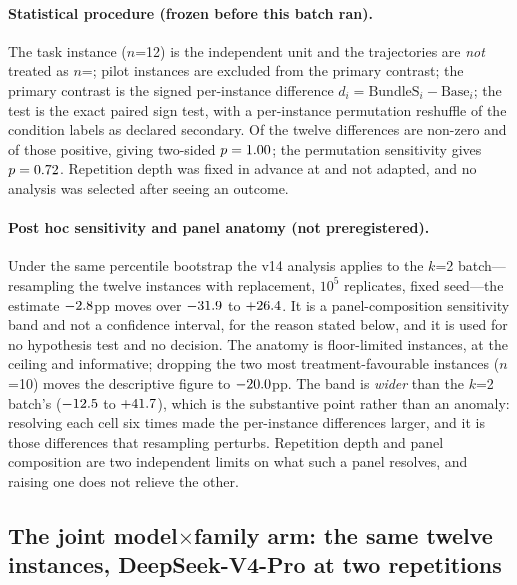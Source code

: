 \documentclass{article}
\begin{document}
\paragraph{Statistical procedure (frozen before this batch ran).} The task instance ($n$=12) is the independent unit and the \StatEightAEpisodes{} trajectories are \emph{not} treated as $n$=\StatEightAEpisodes{}; pilot instances are excluded from the primary contrast; the primary contrast is the signed per-instance difference $d_i=\mathrm{BundleS}_i-\mathrm{Base}_i$; the test is the exact paired sign test, with a per-instance permutation reshuffle of the condition labels as declared secondary. Of the twelve differences \StatEightASignNonzero{} are non-zero and \StatEightASignPositive{} of those positive, giving two-sided $p=1.00$; the permutation sensitivity gives $p=0.72$. Repetition depth was fixed in advance at \StatEightAK{} and not adapted, and no analysis was selected after seeing an outcome.

\paragraph{Post hoc sensitivity and panel anatomy (not preregistered).} Under the same percentile bootstrap the v14 analysis applies to the $k$=2 batch---resampling the twelve instances with replacement, $10^{5}$ replicates, fixed seed---the estimate $-2.8$pp moves over $-31.9$ to $+26.4$. It is a panel-composition sensitivity band and not a confidence interval, for the reason stated below, and it is used for no hypothesis test and no decision. The anatomy is \StatEightAFloorN{} floor-limited instances, \StatEightACeilingN{} at the ceiling and \StatEightAInformativeN{} informative; dropping the two most treatment-favourable instances ($n$=10) moves the descriptive figure to $-20.0$pp. The band is \emph{wider} than the $k$=2 batch's ($-12.5$ to $+41.7$), which is the substantive point rather than an anomaly: resolving each cell six times made the per-instance differences larger, and it is those differences that resampling perturbs. Repetition depth and panel composition are two independent limits on what such a panel resolves, and raising one does not relieve the other.

\subsection*{The joint model$\times$family arm: the same twelve instances, DeepSeek-V4-Pro at two repetitions}
\end{document}
